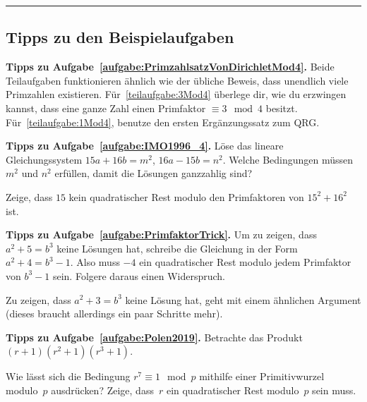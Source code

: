 \newpage\phantom{newpage}\vfill\hrule\vspace{-1em}
\subsection*{Tipps zu den Beispielaufgaben}

\textbf{Tipps zu Aufgabe~\ref{aufgabe:PrimzahlsatzVonDirichletMod4}.} Beide Teilaufgaben funktionieren ähnlich wie der übliche Beweis, dass unendlich viele Primzahlen existieren. Für~\ref{teilaufgabe:3Mod4} überlege dir, wie du erzwingen kannst, dass eine ganze Zahl einen Primfaktor $\equiv 3\mod 4$ besitzt. Für~\ref{teilaufgabe:1Mod4}, benutze den ersten Ergänzungssatz zum QRG.



\textbf{Tipps zu Aufgabe~\ref{aufgabe:IMO1996_4}.} Löse das lineare Gleichungssystem $15a+16b=m^2$, $16a-15b=n^2$. Welche Bedingungen müssen $m^2$ und $n^2$ erfüllen, damit die Lösungen ganzzahlig sind?

Zeige, dass $15$ kein quadratischer Rest modulo den Primfaktoren von $15^2+16^2$ ist.

\textbf{Tipps zu Aufgabe~\ref{aufgabe:PrimfaktorTrick}.} Um zu zeigen, dass $a^2+5=b^3$ keine Lösungen hat, schreibe die Gleichung in der Form $a^2+4=b^3-1$. Also muss $-4$ ein quadratischer Rest modulo jedem Primfaktor von $b^3-1$ sein. Folgere daraus einen Widerspruch.

Zu zeigen, dass $a^2+3=b^3$ keine Lösung hat, geht mit einem ähnlichen Argument (dieses braucht allerdings ein paar Schritte mehr).

\textbf{Tipps zu Aufgabe~\ref{aufgabe:Polen2019}.} Betrachte das Produkt $(r+1)(r^2+1)(r^3+1)$.

Wie lässt sich die Bedingung $r^7\equiv 1\mod p$ mithilfe einer Primitivwurzel modulo~$p$ ausdrücken? Zeige, dass~$r$ ein quadratischer Rest modulo~$p$ sein muss.
